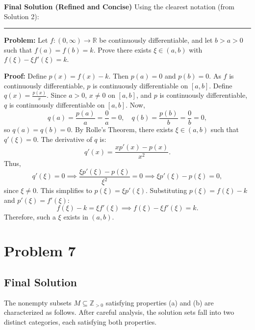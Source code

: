 \documentclass[12pt,a4paper]{article}
\theoremstyle{definition}
\begin{document}
    \textbf{Final Solution (Refined and Concise)}
    Using the clearest notation (from Solution 2):

    \hrule

    \textbf{Problem:}
    Let $f: (0, \infty) \to \mathbb{R}$ be continuously differentiable, and let $b > a > 0$ such that $f(a) = f(b) = k$. Prove there exists $\xi \in (a, b)$ with $f(\xi) - \xi f'(\xi) = k$.

    \textbf{Proof:}
    Define $p(x) = f(x) - k$. Then $p(a) = 0$ and $p(b) = 0$. As $f$ is continuously differentiable, $p$ is continuously differentiable on $[a, b]$. Define $q(x) = \frac{p(x)}{x}$. Since $a > 0$, $x \neq 0$ on $[a, b]$, and $p$ is continuously differentiable, $q$ is continuously differentiable on $[a, b]$. Now,
    \[
        q(a) = \frac{p(a)}{a} = \frac{0}{a} = 0, \quad q(b) = \frac{p(b)}{b} = \frac{0}{b} = 0,
    \]
    so $q(a) = q(b) = 0$. By Rolle's Theorem, there exists $\xi \in (a, b)$ such that $q'(\xi) = 0$. The derivative of $q$ is:
    \[
        q'(x) = \frac{x p'(x) - p(x)}{x^2}.
    \]
    Thus,
    \[
        q'(\xi) = 0 \implies \frac{\xi p'(\xi) - p(\xi)}{\xi^2} = 0 \implies \xi p'(\xi) - p(\xi) = 0,
    \]
    since $\xi \neq 0$. This simplifies to $p(\xi) = \xi p'(\xi)$. Substituting $p(\xi) = f(\xi) - k$ and $p'(\xi) = f'(\xi)$:
    \[
        f(\xi) - k = \xi f'(\xi) \implies f(\xi) - \xi f'(\xi) = k.
    \]
    Therefore, such a $\xi$ exists in $(a, b)$.


\section{Problem 7}
\subsection{Final Solution}
    The nonempty subsets $M \subseteq \mathbb{Z}_{>0}$ satisfying properties (a) and (b) are characterized as follows. After careful analysis, the solution sets fall into two distinct categories, each satisfying both properties.
\end{document}
